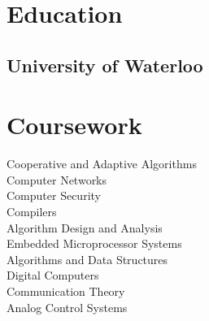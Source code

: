 \documentclass[]{deedy-resume-openfont}
\begin{document}
%
%

%
%



%
%

\begin{minipage}[t]{0.31\textwidth} 


\section{Education} 

\subsection{University of Waterloo}
\sectionsep



\section{Coursework}
Cooperative and Adaptive Algorithms \\
Computer Networks \\
Computer Security \\
Compilers \\
Algorithm Design and Analysis \\
Embedded Microprocessor Systems \\
Algorithms and Data Structures \\
Digital Computers \\
Communication Theory \\
Analog Control Systems
\sectionsep



\end{minipage}
\end{document}
